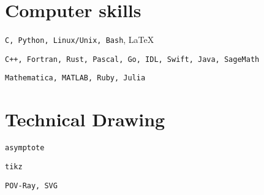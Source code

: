 \documentclass[a4paper,sans]{moderncv}
\begin{document}
    \section{Computer skills}
        \texttt{C, Python, Linux/Unix, Bash}, \LaTeX\par
        \texttt{C++, Fortran, Rust, Pascal, Go, IDL, Swift, Java, SageMath}\par
        \texttt{Mathematica, MATLAB, Ruby, Julia}
    \section{Technical Drawing}
        \texttt{asymptote}\par
        \texttt{tikz}\par
        \texttt{POV-Ray, SVG}
\end{document}
